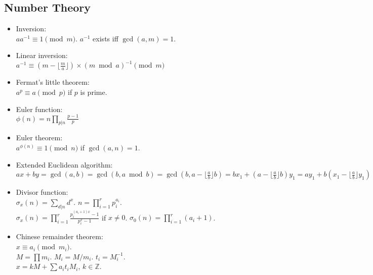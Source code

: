 \documentclass[twocolumn]{article}
\begin{document}
\subsection{Number Theory}

\begin{itemize}
    \item Inversion:\\ $aa^{-1} \equiv 1 \pmod{m}$. $a^{-1}$ exists iff $\gcd(a,m)=1$.
    \item Linear inversion:\\ $a^{-1} \equiv (m - \lfloor\frac{m}{a}\rfloor) \times (m \bmod a)^{-1} \pmod{m}$
    \item Fermat's little theorem:\\ $a^p \equiv a \pmod{p}$ if $p$ is prime.
    \item Euler function:\\ $\phi(n)=n \prod_{p|n} \frac{p-1}{p}$
    \item Euler theorem:\\ $a^{\phi(n)} \equiv 1 \pmod{n}$ if $\gcd(a,n) = 1$.
    \item Extended Euclidean algorithm:\\
    $ax+by=\gcd(a,b)=\gcd(b, a \bmod b)=\gcd(b, a-\lfloor\frac{a}{b}\rfloor b)=bx_1+(a-\lfloor\frac{a}{b}\rfloor b)y_1=ay_1+b(x_1-\lfloor\frac{a}{b}\rfloor y_1)$
    \item Divisor function:\\ $\sigma_x(n) = \sum_{d|n}d^x$. $n=\prod_{i=1}^r p_i^{a_i}$.\\ $\sigma_x(n)=\prod_{i=1}^r \frac{p_i^{(a_i+1)x}-1}{p_i^x-1}$ if $x \neq 0$. $\sigma_0(n)=\prod_{i=1}^r (a_i+1)$.
    \item Chinese remainder theorem:\\ $x \equiv a_i \pmod{m_i}$.\\
        $M=\prod m_i$. $M_i=M/m_i$. $t_i=M_i^{-1}$.\\
        $x = kM + \sum a_i t_i M_i$, $k \in \mathbb{Z}$.
\end{itemize}
\end{document}

